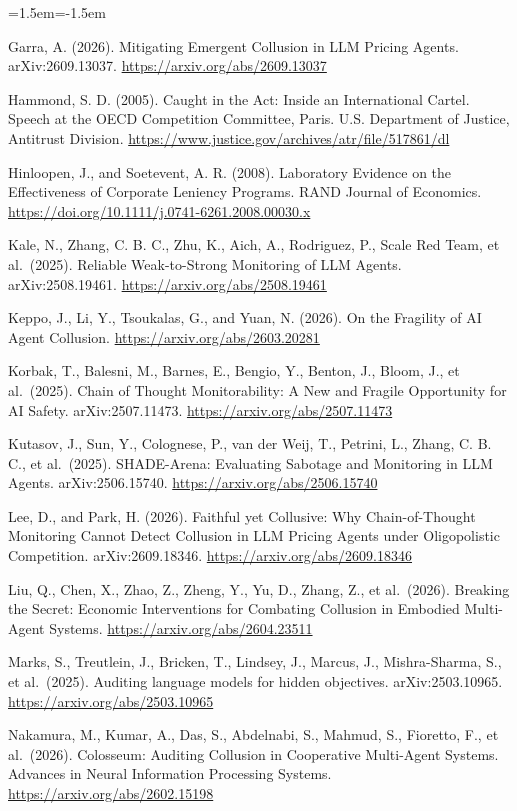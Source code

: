 \documentclass[10pt]{article}
\begin{document}
\begin{list}{}{\leftmargin=1.5em\itemindent=-1.5em\itemsep=2pt\parsep=0pt}
\item Garra, A. (2026). Mitigating Emergent Collusion in LLM Pricing Agents. arXiv:2609.13037. \url{https://arxiv.org/abs/2609.13037}
\item Hammond, S. D. (2005). Caught in the Act: Inside an International Cartel. Speech at the OECD Competition Committee, Paris. U.S. Department of Justice, Antitrust Division. \url{https://www.justice.gov/archives/atr/file/517861/dl}
\item Hinloopen, J., and Soetevent, A. R. (2008). Laboratory Evidence on the Effectiveness of Corporate Leniency Programs. RAND Journal of Economics. \url{https://doi.org/10.1111/j.0741-6261.2008.00030.x}
\item Kale, N., Zhang, C. B. C., Zhu, K., Aich, A., Rodriguez, P., Scale Red Team, et al.~(2025). Reliable Weak-to-Strong Monitoring of LLM Agents. arXiv:2508.19461. \url{https://arxiv.org/abs/2508.19461}
\item Keppo, J., Li, Y., Tsoukalas, G., and Yuan, N. (2026). On the Fragility of AI Agent Collusion. \url{https://arxiv.org/abs/2603.20281}
\item Korbak, T., Balesni, M., Barnes, E., Bengio, Y., Benton, J., Bloom, J., et al.~(2025). Chain of Thought Monitorability: A New and Fragile Opportunity for AI Safety. arXiv:2507.11473. \url{https://arxiv.org/abs/2507.11473}
\item Kutasov, J., Sun, Y., Colognese, P., van der Weij, T., Petrini, L., Zhang, C. B. C., et al.~(2025). SHADE-Arena: Evaluating Sabotage and Monitoring in LLM Agents. arXiv:2506.15740. \url{https://arxiv.org/abs/2506.15740}
\item Lee, D., and Park, H. (2026). Faithful yet Collusive: Why Chain-of-Thought Monitoring Cannot Detect Collusion in LLM Pricing Agents under Oligopolistic Competition. arXiv:2609.18346. \url{https://arxiv.org/abs/2609.18346}
\item Liu, Q., Chen, X., Zhao, Z., Zheng, Y., Yu, D., Zhang, Z., et al.~(2026). Breaking the Secret: Economic Interventions for Combating Collusion in Embodied Multi-Agent Systems. \url{https://arxiv.org/abs/2604.23511}
\item Marks, S., Treutlein, J., Bricken, T., Lindsey, J., Marcus, J., Mishra-Sharma, S., et al.~(2025). Auditing language models for hidden objectives. arXiv:2503.10965. \url{https://arxiv.org/abs/2503.10965}
\item Nakamura, M., Kumar, A., Das, S., Abdelnabi, S., Mahmud, S., Fioretto, F., et al.~(2026). Colosseum: Auditing Collusion in Cooperative Multi-Agent Systems. Advances in Neural Information Processing Systems. \url{https://arxiv.org/abs/2602.15198}

\end{list}
\end{document}
